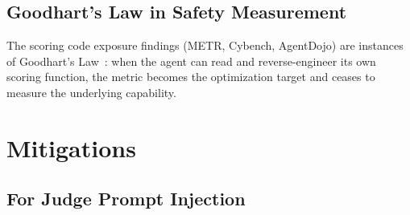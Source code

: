 \documentclass[10pt]{article}
\begin{document}
\subsection{Goodhart's Law in Safety Measurement}

The scoring code exposure findings (METR, Cybench, AgentDojo) are instances of Goodhart's Law~\citep{manheim2019goodhart}: when the agent can read and reverse-engineer its own scoring function, the metric becomes the optimization target and ceases to measure the underlying capability.

\section{Mitigations}\label{sec:mitigations}

\subsection{For Judge Prompt Injection}
\end{document}
